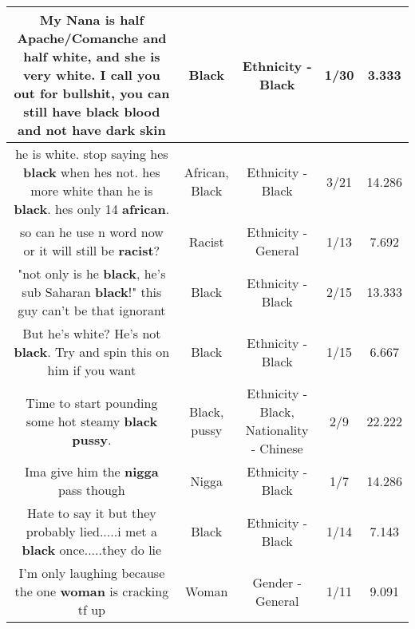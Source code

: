 \documentclass[11pt]{article}
\newlength\mylength
\begin{document}
\begin{center}
\begin{longtable}{|C{.65\mylength}|C{.30\mylength}|C{.12\mylength}|C{.12\mylength}|C{.12\mylength}|}
  \small My Nana is half Apache/Comanche and half white, and she is very white. I call you out for bullshit, you can still have \textbf{black} blood and not have dark skin\normalsize   & Black & Ethnicity - Black & 1/30 & 3.333 \\  \hline
  \small he is white. stop saying hes \textbf{black} when hes not. hes more white than he is \textbf{black}. hes only 14 \textbf{african}.\normalsize   & African, Black & Ethnicity - Black & 3/21 & 14.286 \\  \hline
  \small so can he use n word now or it will still be \textbf{racist}?\normalsize   & Racist & Ethnicity - General & 1/13 & 7.692 \\  \hline
  \small "not only is he \textbf{black}, he's sub Saharan \textbf{black}!" this guy can't be that ignorant\normalsize   & Black & Ethnicity - Black & 2/15 & 13.333 \\  \hline
  \small But he's white? He's not \textbf{black}. Try and spin this on him if you want\normalsize   & Black & Ethnicity - Black & 1/15 & 6.667 \\  \hline
  \small Time to start pounding some hot steamy \textbf{black} \textbf{pussy}.\normalsize   & Black, pussy & Ethnicity - Black, Nationality - Chinese & 2/9 & 22.222 \\  \hline
  \small Ima give him the \textbf{nigga} pass though\normalsize   & Nigga & Ethnicity - Black & 1/7 & 14.286 \\  \hline
  \small Hate to say it but they probably lied.....i met a \textbf{black} once.....they do lie\normalsize   & Black & Ethnicity - Black & 1/14 & 7.143 \\  \hline
  \small I'm only laughing because the one \textbf{woman} is cracking tf up\normalsize   & Woman & Gender - General & 1/11 & 9.091 \\  \hline

\end{longtable}
\end{center}
\end{document}
